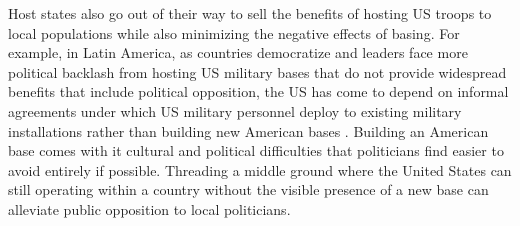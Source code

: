 {%
	
	Host states also go out of their way to sell the benefits of hosting US troops to local populations while also minimizing the negative effects of basing. For example, in Latin America, as countries democratize and leaders face more political backlash from hosting US military bases that do not provide widespread benefits that include political opposition, the US has come to depend on informal agreements under which US military personnel deploy to existing military installations rather than building new American bases \cite{Bitar2016}. Building an American base comes with it cultural and political difficulties that politicians find easier to avoid entirely if possible. Threading a middle ground where the United States can still operating within a country without the visible presence of a new base can alleviate public opposition to local politicians. 
	
}
